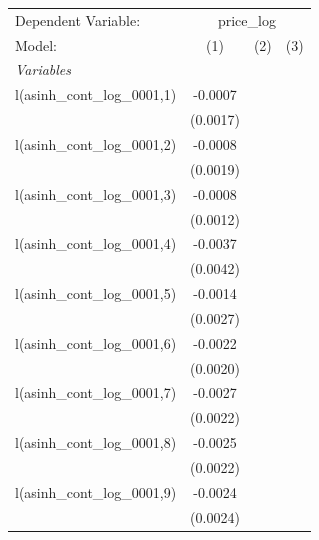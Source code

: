 
\begingroup
\centering
\begin{tabular}{lccc}
   \tabularnewline \midrule \midrule
   Dependent Variable: & \multicolumn{3}{c}{price\_log}\\
   Model:                                 & (1)      & (2)                   & (3)\\  
   \midrule
   \emph{Variables}\\
   l(asinh\_cont\_log\_0001,1)            & -0.0007  &                       &   \\   
                                          & (0.0017) &                       &   \\   
   l(asinh\_cont\_log\_0001,2)            & -0.0008  &                       &   \\   
                                          & (0.0019) &                       &   \\   
   l(asinh\_cont\_log\_0001,3)            & -0.0008  &                       &   \\   
                                          & (0.0012) &                       &   \\   
   l(asinh\_cont\_log\_0001,4)            & -0.0037  &                       &   \\   
                                          & (0.0042) &                       &   \\   
   l(asinh\_cont\_log\_0001,5)            & -0.0014  &                       &   \\   
                                          & (0.0027) &                       &   \\   
   l(asinh\_cont\_log\_0001,6)            & -0.0022  &                       &   \\   
                                          & (0.0020) &                       &   \\   
   l(asinh\_cont\_log\_0001,7)            & -0.0027  &                       &   \\   
                                          & (0.0022) &                       &   \\   
   l(asinh\_cont\_log\_0001,8)            & -0.0025  &                       &   \\   
                                          & (0.0022) &                       &   \\   
   l(asinh\_cont\_log\_0001,9)            & -0.0024  &                       &   \\   
                                          & (0.0024) &                       &   \\   

\end{tabular}
